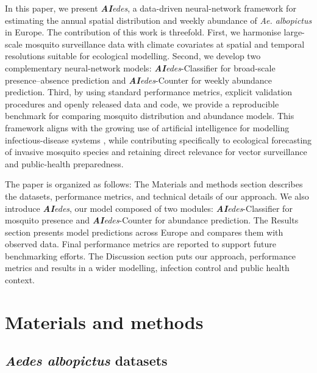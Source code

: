 \documentclass[preprint,12pt]{elsarticle}
\begin{document}
In this paper, we present \textit{\textbf{AI}edes}, a data-driven neural-network framework for estimating the annual spatial distribution and weekly abundance of \emph{Ae. albopictus} in Europe. The contribution of this work is threefold. First, we harmonise large-scale mosquito surveillance data with climate covariates at spatial and temporal resolutions suitable for ecological modelling. Second, we develop two complementary neural-network models: \textit{\textbf{AI}edes}-Classifier for broad-scale presence--absence prediction and \textit{\textbf{AI}edes}-Counter for weekly abundance prediction. Third, by using standard performance metrics, explicit validation procedures and openly released data and code, we provide a reproducible benchmark for comparing mosquito distribution and abundance models. This framework aligns with the growing use of artificial intelligence for modelling infectious-disease systems \cite{kraemer2025}, while contributing specifically to ecological forecasting of invasive mosquito species and retaining direct relevance for vector surveillance and public-health preparedness.

The paper is organized as follows: The Materials and methods section describes the datasets, performance metrics, and technical details of our approach. We also introduce \textit{\textbf{AI}edes}, our model composed of two modules: \textit{\textbf{AI}edes}-Classifier for mosquito presence and \textit{\textbf{AI}edes}-Counter for abundance prediction. The Results section presents model predictions across Europe and compares them with observed data. Final performance metrics are reported to support future benchmarking efforts. The Discussion section puts our approach, performance metrics and results in a wider modelling, infection control and public health context.



\section{Materials and methods}


\subsection{\textit{Aedes albopictus} datasets}
\end{document}

